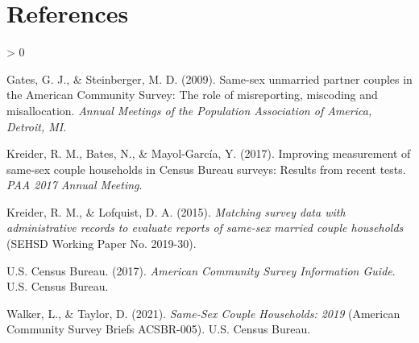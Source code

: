 \documentclass[
  11pt,
]{article}
\newlength{\cslhangindent}
\newenvironment{CSLReferences}[2] %
 {%
  \setlength{\parindent}{0pt}
  \ifodd #1 \everypar{\setlength{\hangindent}{\cslhangindent}}\ignorespaces\fi
  \ifnum #2 > 0
  \setlength{\parskip}{#2\baselineskip}
  \fi
 }%
 {}
\begin{document}
\newpage

\hypertarget{references}{%
\section{References}\label{references}}

\setlength{\parindent}{-0.2in}
\setlength{\leftskip}{0.2in}
\setlength{\parskip}{8pt}

\noindent

\hypertarget{refs}{}
\begin{CSLReferences}{1}{0}
\leavevmode\hypertarget{ref-gates_2009}{}%
Gates, G. J., \& Steinberger, M. D. (2009). Same-sex unmarried partner couples in the {American Community Survey}: {The} role of misreporting, miscoding and misallocation. \emph{Annual Meetings of the Population Association of America, Detroit, {MI}}.

\leavevmode\hypertarget{ref-kreider_2017}{}%
Kreider, R. M., Bates, N., \& Mayol-García, Y. (2017). Improving measurement of same-sex couple households in {Census Bureau} surveys: {Results} from recent tests. \emph{{PAA} 2017 Annual Meeting}.

\leavevmode\hypertarget{ref-kreider_2015}{}%
Kreider, R. M., \& Lofquist, D. A. (2015). \emph{Matching survey data with administrative records to evaluate reports of same-sex married couple households} (SEHSD Working Paper No. 2019-30).

\leavevmode\hypertarget{ref-u.s.censusbureau_2017}{}%
U.S. Census Bureau. (2017). \emph{American {Community Survey Information Guide}}. {U.S. Census Bureau}.

\leavevmode\hypertarget{ref-walker_2021}{}%
Walker, L., \& Taylor, D. (2021). \emph{Same-{Sex Couple Households}: 2019} (American Community Survey Briefs ACSBR-005). {U.S. Census Bureau}.

\end{CSLReferences}
\end{document}

